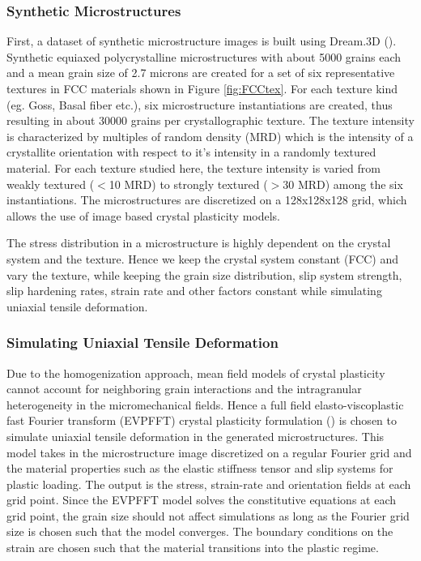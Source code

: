 \documentclass[preprint,1p,times,authoryear]{elsarticle}%
\begin{document}
\subsubsection{Synthetic Microstructures}

First, a dataset of synthetic microstructure images is built using Dream.3D (\cite{Groeber2014}). Synthetic equiaxed polycrystalline microstructures with about 5000 grains each and a mean grain size of 2.7 microns are created for a set of six representative textures in FCC materials shown in Figure \ref{fig:FCCtex}. For each texture kind (eg. Goss, Basal fiber etc.), six microstructure instantiations are created, thus resulting in about 30000 grains per crystallographic texture. The texture intensity is characterized by multiples of random density (MRD) which is the intensity of a crystallite orientation with respect to it's intensity in a randomly textured material. For each texture studied here, the texture intensity is varied from weakly textured ($<$10 MRD) to strongly textured ($>$30 MRD) among the six instantiations. The microstructures are discretized on a 128x128x128 grid, which allows the use of image based crystal plasticity models. %

The stress distribution in a microstructure is highly dependent on the crystal system and the texture. Hence we keep the crystal system constant (FCC) and vary the texture, while keeping the grain size distribution, slip system strength, slip hardening rates, strain rate and other factors constant while simulating uniaxial tensile deformation. 

\subsubsection{Simulating Uniaxial Tensile Deformation}
Due to the homogenization approach, mean field models of crystal plasticity cannot account for neighboring grain interactions and the intragranular heterogeneity in the micromechanical fields. Hence a full field elasto-viscoplastic fast Fourier transform (EVPFFT) crystal plasticity formulation (\cite{Lebensohn2012}) is chosen to simulate uniaxial tensile deformation in the generated microstructures. This model takes in the microstructure image discretized on a regular Fourier grid and the material properties such as the elastic stiffness tensor and slip systems for plastic loading. The output is the stress, strain-rate and orientation fields at each grid point. Since the EVPFFT model solves the constitutive equations at each grid point, the grain size should not affect simulations as long as the Fourier grid size is chosen such that the model converges. The boundary conditions on the strain are chosen such that the material transitions into the plastic regime. 
\end{document}
